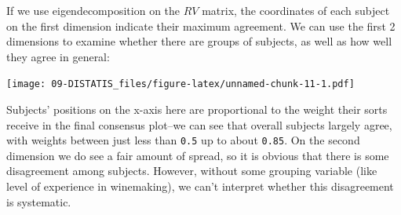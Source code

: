 \documentclass[
]{book}
\newenvironment{Shaded}{\begin{snugshade}}{\end{snugshade}}
\newcommand{\AttributeTok}[1]{\textcolor[rgb]{0.13,0.29,0.53}{#1}}
\newcommand{\DecValTok}[1]{\textcolor[rgb]{0.00,0.00,0.81}{#1}}
\newcommand{\FunctionTok}[1]{\textcolor[rgb]{0.13,0.29,0.53}{\textbf{#1}}}
\newcommand{\NormalTok}[1]{#1}
\newcommand{\OtherTok}[1]{\textcolor[rgb]{0.56,0.35,0.01}{#1}}
\newcommand{\SpecialCharTok}[1]{\textcolor[rgb]{0.81,0.36,0.00}{\textbf{#1}}}
\newcommand{\StringTok}[1]{\textcolor[rgb]{0.31,0.60,0.02}{#1}}
\begin{document}
If we use eigendecomposition on the \(RV\) matrix, the coordinates of each subject on the first dimension indicate their maximum agreement. We can use the first 2 dimensions to examine whether there are groups of subjects, as well as how well they agree in general:

\begin{Shaded}
\end{Shaded}

\texttt{[image: 09-DISTATIS\_files/figure-latex/unnamed-chunk-11-1.pdf]}

Subjects' positions on the x-axis here are proportional to the weight their sorts receive in the final consensus plot--we can see that overall subjects largely agree, with weights between just less than \texttt{0.5} up to about \texttt{0.85}. On the second dimension we do see a fair amount of spread, so it is obvious that there is some disagreement among subjects. However, without some grouping variable (like level of experience in winemaking), we can't interpret whether this disagreement is systematic.
\end{document}

